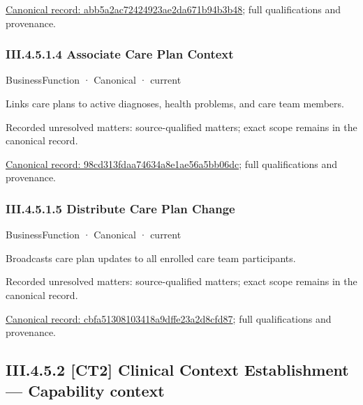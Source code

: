 {\footnotesize \href{../../../../../../../../continuum/business/business-function/abb5a2ac72424923ae2da671b94b3b48.md}{Canonical record: abb5a2ac72424923ae2da671b94b3b48}; full qualifications and provenance.}\par
\subsubsection*{III.4.5.1.4 Associate Care Plan Context}
\label{navigation:III.4.5.1.4}

\label{element:98cd313fdaa74634a8e1ae56a5bb06dc}
{\small BusinessFunction · Canonical · current}\par

Links care plans to active diagnoses, health problems, and care team members.


{\small Recorded unresolved matters: source-qualified matters; exact scope remains in the canonical record.}\par
{\footnotesize \href{../../../../../../../../continuum/business/business-function/98cd313fdaa74634a8e1ae56a5bb06dc.md}{Canonical record: 98cd313fdaa74634a8e1ae56a5bb06dc}; full qualifications and provenance.}\par
\subsubsection*{III.4.5.1.5 Distribute Care Plan Change}
\label{navigation:III.4.5.1.5}

\label{element:cbfa51308103418a9dffe23a2d8cfd87}
{\small BusinessFunction · Canonical · current}\par

Broadcasts care plan updates to all enrolled care team participants.


{\small Recorded unresolved matters: source-qualified matters; exact scope remains in the canonical record.}\par
{\footnotesize \href{../../../../../../../../continuum/business/business-function/cbfa51308103418a9dffe23a2d8cfd87.md}{Canonical record: cbfa51308103418a9dffe23a2d8cfd87}; full qualifications and provenance.}\par
\subsection*{III.4.5.2 [CT2] Clinical Context Establishment — Capability context}
\label{navigation:III.4.5.2}


